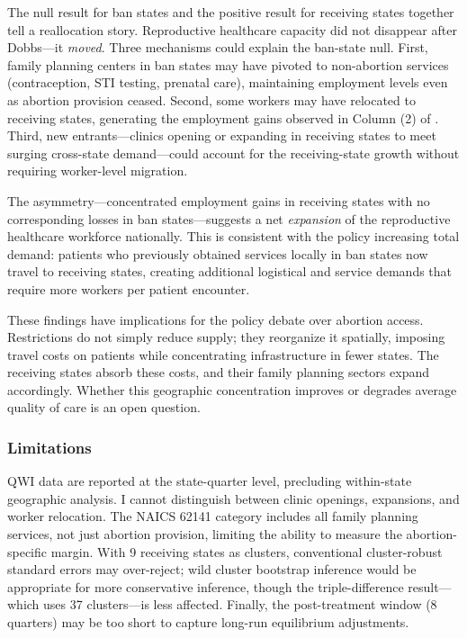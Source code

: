 \documentclass[12pt]{article}
\begin{document}
The null result for ban states and the positive result for receiving states together tell a reallocation story. Reproductive healthcare capacity did not disappear after Dobbs---it \textit{moved}. Three mechanisms could explain the ban-state null. First, family planning centers in ban states may have pivoted to non-abortion services (contraception, STI testing, prenatal care), maintaining employment levels even as abortion provision ceased. Second, some workers may have relocated to receiving states, generating the employment gains observed in Column (2) of . Third, new entrants---clinics opening or expanding in receiving states to meet surging cross-state demand---could account for the receiving-state growth without requiring worker-level migration.

The asymmetry---concentrated employment gains in receiving states with no corresponding losses in ban states---suggests a net \textit{expansion} of the reproductive healthcare workforce nationally. This is consistent with the policy increasing total demand: patients who previously obtained services locally in ban states now travel to receiving states, creating additional logistical and service demands that require more workers per patient encounter.

These findings have implications for the policy debate over abortion access. Restrictions do not simply reduce supply; they reorganize it spatially, imposing travel costs on patients while concentrating infrastructure in fewer states. The receiving states absorb these costs, and their family planning sectors expand accordingly. Whether this geographic concentration improves or degrades average quality of care is an open question.

\subsubsection*{Limitations}
QWI data are reported at the state-quarter level, precluding within-state geographic analysis. I cannot distinguish between clinic openings, expansions, and worker relocation. The NAICS 62141 category includes all family planning services, not just abortion provision, limiting the ability to measure the abortion-specific margin. With 9 receiving states as clusters, conventional cluster-robust standard errors may over-reject; wild cluster bootstrap inference \citep{cameron2008} would be appropriate for more conservative inference, though the triple-difference result---which uses 37 clusters---is less affected. Finally, the post-treatment window (8 quarters) may be too short to capture long-run equilibrium adjustments.
\end{document}
